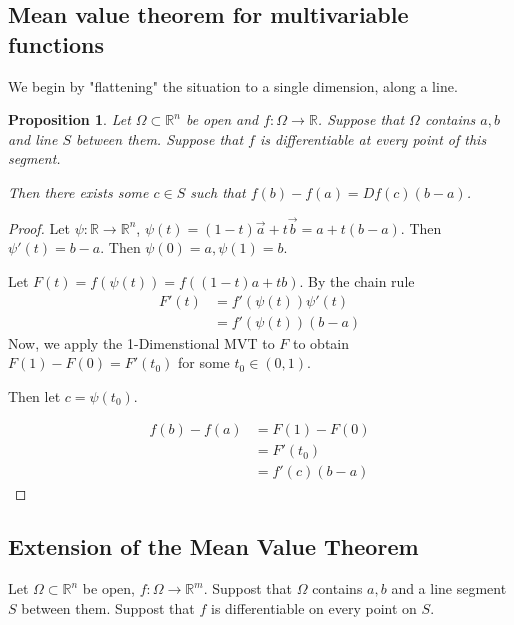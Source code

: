 \documentclass[12pt]{article}
\newcommand{\R}{\mathbb{R}}
\newtheorem{proposition}{Proposition}[theorem]
\theoremstyle{definition}
\theoremstyle{remark}
\begin{document}
\subsection{Mean value theorem for multivariable functions}
We begin by "flattening" the situation to a single dimension, along a line.
\begin{proposition}
   Let $\Omega\subset\R^n$ be open and $f:\Omega\to\R$. Suppose that $\Omega$ contains $a,b$ and line $S$ between them. Suppose that $f$ is differentiable at every point of this segment.
   
   Then there exists some $c\in S$ such that $f(b)-f(a)=Df(c)(b-a)$.
\end{proposition}
\begin{proof}
   Let $\psi:\R\to\R^n$, $\psi(t)=(1-t)\vec{a}+t\vec{b}=a+t(b-a)$.
   Then $\psi'(t)=b-a$. Then $\psi(0)=a, \psi(1)=b$. 

   Let $F(t)=f(\psi(t))=f((1-t)a+tb)$.
   By the chain rule
   \begin{align*}
      F'(t)&=f'(\psi(t))\psi'(t)\\
            &=f'(\psi(t))(b-a) 
   \end{align*}
   Now, we apply the 1-Dimenstional MVT to $F$ to obtain $F(1)-F(0)=F'(t_0)$ for some $t_0\in(0,1)$.

   Then let $c=\psi(t_0)$.

    \begin{align*}
        f(b)-f(a)&=F(1)-F(0)\\
                &=F'(t_0)\\
                &=f'(c)(b-a)
    \end{align*}
\end{proof}
\subsection{Extension of the Mean Value Theorem}
Let $\Omega\subset\R^n$ be open, $f:\Omega\to\R^m$. Suppost that $\Omega$ contains $a,b$ and a line segment $S$ between them. Suppost that $f$ is differentiable on every point on $S$.
\end{document}
